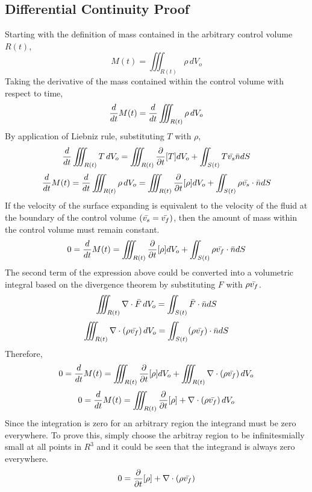 \documentclass[a4paper, 12pt]{report}
\begin{document}
\begin{center}
\subsection{Differential Continuity Proof}
\begin{comment}
\end{comment}
Starting with the definition of mass contained in the arbitrary control volume $R(t)$,
$$M(t) = \iiint_{R(t)} \rho \,dV_o$$
Taking the derivative of the mass contained within the control volume with respect to time, 
$$\frac{d}{dt} M(t) = \frac{d}{dt} \iiint_{R(t)} \rho \,dV_o$$
By application of Liebniz rule, substituting $T$ with $\rho$,
$$\frac{d}{dt}\iiint_{R(t)}T\,dV_o = \iiint_{R(t)}\frac{\partial}{\partial t}[T]dV_o + \iint_{S(t)}T\bar{v_s}\bar{n}dS$$
$$\frac{d}{dt} M(t) = \frac{d}{dt} \iiint_{R(t)} \rho \,dV_o = \iiint_{R(t)}\frac{\partial}{\partial t}[\rho]dV_o + \iint_{S(t)}\rho\bar{v_s}\cdot\bar{n}dS$$
If the velocity of the surface expanding is equivalent to the velocity of the fluid at the boundary of the control volume $(\bar{v_s} = \bar{v_f})$, then the amount of mass within the control volume must remain constant. 
$$0 = \frac{d}{dt} M(t) = \iiint_{R(t)}\frac{\partial}{\partial t}[\rho]dV_o + \iint_{S(t)}\rho\bar{v_f}\cdot\bar{n}dS$$
The second term of the expression above could be converted into a volumetric integral based on the divergence theorem by substituting $F$ with $\rho\bar{v_f}$.
$$\iiint_{R(t)}  \nabla \cdot \bar{F} \,dV_o = \iint_{S(t)}\bar{F}\cdot \bar{n}dS$$
$$\iiint_{R(t)} \nabla \cdot (\rho\bar{v_f}) \,dV_o = \iint_{S(t)}(\rho\bar{v_f})\cdot\bar{n}dS$$
Therefore,
$$0 = \frac{d}{dt} M(t) = \iiint_{R(t)}\frac{\partial}{\partial t}[\rho]dV_o + \iiint_{R(t)} \nabla \cdot (\rho\bar{v_f}) \,dV_o$$
$$0 = \frac{d}{dt} M(t) = \iiint_{R(t)}\frac{\partial}{\partial t}[\rho] +  \nabla \cdot (\rho\bar{v_f}) \,dV_o$$
Since the integration is zero for an arbitrary region the integrand must be zero everywhere. To prove this, simply choose the arbitray region to be infinitesmially small at all points in $R^3$ and it could be seen that the integrand is always zero everywhere.
$$0 = \frac{\partial}{\partial t}[\rho] +  \nabla \cdot (\rho\bar{v_f})$$

\end{center}
\end{document}
